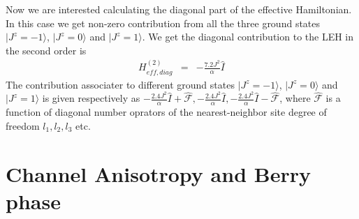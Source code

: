 \documentclass[reprint,prb,superscriptaddress]{revtex4-1}
\begin{document}
 
\noindent Now we are interested calculating the diagonal part of the effective Hamiltonian. In this case we get non-zero contribution from all the three ground states $|J^z=-1\rangle$, $|J^z=0\rangle$ and $|J^z=1\rangle$.
We get the diagonal contribution to the LEH in the second order is 
\begin{eqnarray}
H^{(2)}_{eff, diag} &=& - \frac{7.2 J^2}{\alpha} \hat{I}
\end{eqnarray}
The contribution associater to different ground states $|J^z=-1\rangle$, $|J^z=0\rangle$ and $|J^z=1\rangle$ is given respectively as $- \frac{2.4 J^2}{\alpha} \hat{I} + \hat{\mathcal{F}},- \frac{2.4 J^2}{\alpha} \hat{I} ,- \frac{2.4 J^2}{\alpha} \hat{I} - \hat{\mathcal{F} }$,
\noindent where $\hat{\mathcal{F}}$ is a function of diagonal number oprators of the nearest-neighbor site degree of freedom $l_1,l_2,l_3$ etc.




\section{Channel Anisotropy and Berry phase}
\end{document}
